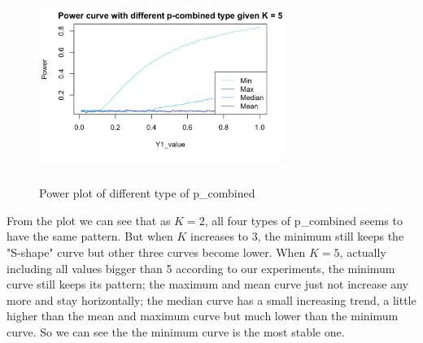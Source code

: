 \documentclass[10pt,english]{article}\usepackage{graphicx, color}
\numberwithin{equation}{section}
\numberwithin{figure}{section}
\begin{document}
\begin{figure}[htbp]
{\begin{minipage}{8cm}
\centering\includegraphics[width=8cm,height=6.5cm]{5}
\end{minipage}
}
\caption{Power plot of different type of p\_combined}
\end{figure}

From the plot we can see that as $K=2$, all four types of p\_combined seems to have the same pattern. But when $K$ increases to 3, the minimum still keeps the "S-shape" curve but other three curves become lower. When $K=5$, actually including all values bigger than 5 according to our experiments, the minimum curve still keeps its pattern; the maximum and mean curve just not increase any more and stay horizontally; the median curve has a small increasing trend, a little higher than the mean and maximum curve but much lower than the minimum curve. So we can see the the minimum curve is the most stable one.
\end{document}
